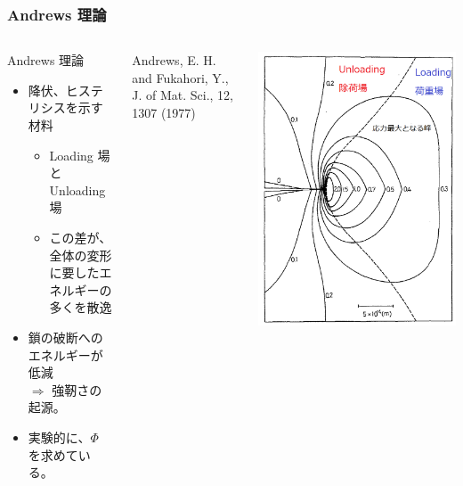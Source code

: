 \documentclass[12pt, dvipdfmx]{beamer}
\begin{document}
\begin{frame}
    \frametitle{Andrews 理論}
    \begin{columns}[totalwidth=1\textwidth]
        \begin{exampleblock}{Andrews 理論}
            \begin{itemize}
            \item
            降伏、ヒステリシスを示す材料
                \begin{itemize}
                \item
                Loading 場とUnloading 場
                \item
                この差が、全体の変形に要したエネルギーの多くを散逸
                \end{itemize}	
            \item
            \alert{鎖の破断へのエネルギーが低減} \\$\Rightarrow$ 強靭さの起源。
            \item
            実験的に、$\Phi$ を求めている。
            \end{itemize}
        \end{exampleblock}
        
        {Andrews, E. H. and Fukahori, Y., J. of Mat. Sci., 12, 1307 (1977)}
        
        \centering
        \includegraphics[width=\textwidth]{./crack.png}
    \end{columns}
    

\end{frame}
\end{document}
